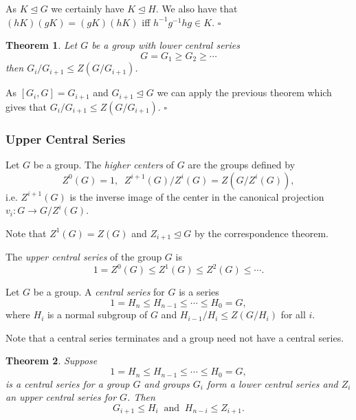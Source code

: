 \documentclass[10pt]{article}
\newtheorem{theorem}{Theorem}[section]
\newenvironment{proof}[1][Proof]{\begin{trivlist}
\item[\hskip \labelsep {\itshape #1}]}{\end{trivlist}}
\newenvironment{definition}[1][Definition]{\begin{trivlist}
\item[\hskip \labelsep {\bfseries #1}]}{\end{trivlist}}
\begin{document}
\begin{proof}
As $K \mathrel{\unlhd} G$ we certainly have $K \mathrel{\unlhd} H$. We also have that $(hK)(gK) = (gK)(hK)$ iff $h^{-1}g^{-1}hg \in K$. $\square$
\end{proof}

\begin{theorem}
Let $G$ be a group with lower central series
$$G = G_1 \geq G_2 \geq \cdots$$
then $G_i/G_{i+1} \leq Z(G/G_{i+1})$.
\end{theorem}

\begin{proof}
As $[G_i, G] = G_{i+1}$ and $G_{i+1} \mathrel{\unlhd} G$ we can apply the previous theorem which gives that $G_i/G_{i+1} \leq Z(G/G_{i+1})$. $\square$ 
\end{proof}

\subsubsection{Upper Central Series}

\begin{definition}
Let $G$ be a group. The \emph{higher centers} of $G$ are the groups defined by
$$Z^0(G) = 1, \;\; Z^{i+1}(G)/Z^i(G) = Z(G/Z^i(G)),$$
i.e. $Z^{i+1}(G)$ is the inverse image of the center in the canonical projection $v_i : G \to G/Z^i(G)$.
\end{definition}

Note that $Z^1(G) = Z(G)$ and $Z_{i+1} \mathrel{\unlhd} G$ by the correspondence theorem.

\begin{definition}
The \emph{upper central series} of the group $G$ is
$$1 = Z^0(G) \leq Z^1(G) \leq Z^2(G) \leq \cdots .$$
\end{definition}

\begin{definition}
Let $G$ be a group. A \emph{central series} for $G$ is a series
$$1 = H_n \leq H_{n-1} \leq \cdots \leq H_0 = G,$$
where $H_i$ is a normal subgroup of $G$ and $H_{i-1}/H_i \leq Z(G/H_i)$ for all $i$.
\end{definition}

Note that a central series terminates and a group need not have a central series.

\begin{theorem}
Suppose
$$1 = H_n \leq H_{n-1} \leq \cdots \leq H_0 = G,$$
is a central series for a group $G$ and groups $G_i$ form a lower central series and $Z_i$ an upper central series for $G$. Then
$$G_{i+1} \leq H_i \;\;\mbox{and}\;\; H_{n-i} \leq Z_{i+1}.$$
\end{theorem}
\end{document}
